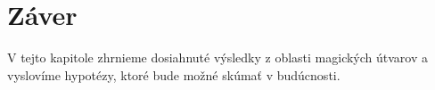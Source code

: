 \chapter*{Záver}  %

V tejto kapitole zhrnieme dosiahnuté výsledky z oblasti magických útvarov a vyslovíme hypotézy, ktoré bude možné skúmať v budúcnosti.